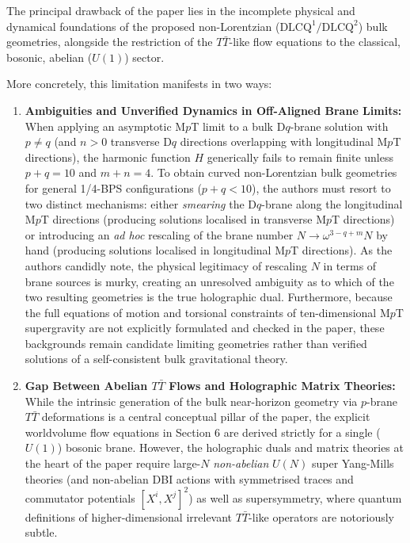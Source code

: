 \documentclass[11pt,a4paper]{article}
\begin{document}
The principal drawback of the paper lies in the incomplete physical and dynamical foundations of the proposed non-Lorentzian ($\text{DLCQ}^1/\text{DLCQ}^2$) bulk geometries, alongside the restriction of the $T\bar{T}$-like flow equations to the classical, bosonic, abelian ($U(1)$) sector.

More concretely, this limitation manifests in two ways:
\begin{enumerate}
    \item \textbf{Ambiguities and Unverified Dynamics in Off-Aligned Brane Limits:} When applying an asymptotic M$p$T limit to a bulk D$q$-brane solution with $p \neq q$ (and $n > 0$ transverse D$q$ directions overlapping with longitudinal M$p$T directions), the harmonic function $H$ generically fails to remain finite unless $p+q=10$ and $m+n=4$. To obtain curved non-Lorentzian bulk geometries for general 1/4-BPS configurations ($p+q < 10$), the authors must resort to two distinct mechanisms: either \emph{smearing} the D$q$-brane along the longitudinal M$p$T directions (producing solutions localised in transverse M$p$T directions) or introducing an \emph{ad hoc} rescaling of the brane number $N \to \omega^{3-q+m} N$ by hand (producing solutions localised in longitudinal M$p$T directions). As the authors candidly note, the physical legitimacy of rescaling $N$ in terms of brane sources is murky, creating an unresolved ambiguity as to which of the two resulting geometries is the true holographic dual. Furthermore, because the full equations of motion and torsional constraints of ten-dimensional M$p$T supergravity are not explicitly formulated and checked in the paper, these backgrounds remain candidate limiting geometries rather than verified solutions of a self-consistent bulk gravitational theory.
    \item \textbf{Gap Between Abelian $T\bar{T}$ Flows and Holographic Matrix Theories:} While the intrinsic generation of the bulk near-horizon geometry via $p$-brane $T\bar{T}$ deformations is a central conceptual pillar of the paper, the explicit worldvolume flow equations in Section 6 are derived strictly for a single ($U(1)$) bosonic brane. However, the holographic duals and matrix theories at the heart of the paper require large-$N$ \emph{non-abelian} $U(N)$ super Yang-Mills theories (and non-abelian DBI actions with symmetrised traces and commutator potentials $[X^i, X^j]^2$) as well as supersymmetry, where quantum definitions of higher-dimensional irrelevant $T\bar{T}$-like operators are notoriously subtle.
\end{enumerate}
\end{document}
